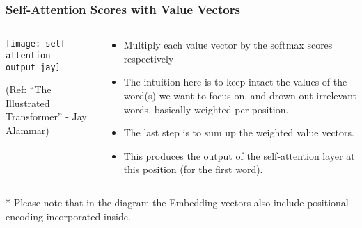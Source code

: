 \begin{frame}[fragile]\frametitle{Self-Attention Scores with Value Vectors}

\begin{columns}
    \begin{column}[T]{0.5\linewidth}
\begin{center}
\texttt{[image: self-attention-output\_jay]}


{\tiny (Ref: ``The Illustrated Transformer'' - Jay Alammar)}
\end{center}		

		\end{column}
    \begin{column}[T]{0.5\linewidth}

\begin{itemize}
\item Multiply each value vector by the softmax scores respectively
\item The intuition here is to keep intact the values of the word(s) we want to focus on, and drown-out irrelevant words, basically weighted per position.
\item The last step is to sum up the weighted value vectors.
\item This produces the output of the self-attention layer at this position (for the first word).
\end{itemize}
    \end{column}
  \end{columns}

* Please note that in the diagram the Embedding vectors also include positional encoding incorporated inside.
\end{frame}

